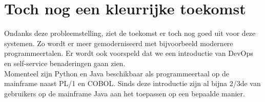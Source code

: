 \section{Toch nog een kleurrijke toekomst}
\label{sec:kleurrijke-toekomst}
Ondanks deze probleemstelling, ziet de toekomst er toch nog goed uit voor deze systemen. Zo wordt er meer gemoderniseerd met bijvoorbeeld modernere programmeertalen. Er wordt ook voorspeld dat we een introductie van DevOps en self-service benaderingen gaan zien. \autocite{Pennaz2023} \\
Momenteel zijn Python en Java beschikbaar als programmeertaal op de mainframe naast PL/1 en COBOL.
Sinds deze introductie zijn al bijna 2/3de van gebruikers op de mainframe Java aan het toepassen op een bepaalde manier. \autocite{Watts2018} 





